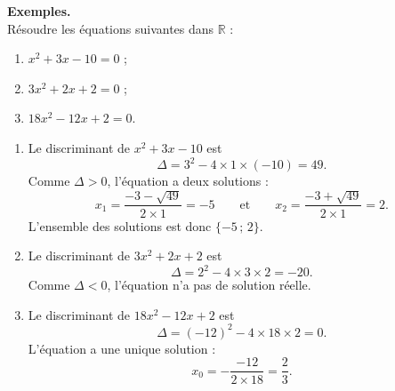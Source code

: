 \documentclass[11pt]{article}
\newcommand{\RR}{\mathbb{R}}
\newenvironment{exemples}{\par\smallskip\noindent\textbf{Exemples. \\}\ignorespaces}{\par\smallskip}
\begin{document}
\begin{exemples}
Résoudre les équations suivantes dans $\RR$ :
\begin{enumerate}[label=\arabic*.]
    \item $x^2+3x-10=0$ ;
    \item $3x^2+2x+2=0$ ;
    \item $18x^2-12x+2=0$.
\end{enumerate}

\begin{enumerate}[label=\arabic*.]
    \item Le discriminant de $x^2+3x-10$ est
    \[
    \Delta=3^2-4\times1\times(-10)=49.
    \]
    Comme $\Delta>0$, l'équation a deux solutions :
    \[
    x_1=\frac{-3-\sqrt{49}}{2\times1}=-5
    \qquad\text{et}\qquad
    x_2=\frac{-3+\sqrt{49}}{2\times1}=2.
    \]
    L'ensemble des solutions est donc $\{-5\,;\,2\}$.

    \item Le discriminant de $3x^2+2x+2$ est
    \[
    \Delta=2^2-4\times3\times2=-20.
    \]
    Comme $\Delta<0$, l'équation n'a pas de solution réelle.

    \item Le discriminant de $18x^2-12x+2$ est
    \[
    \Delta=(-12)^2-4\times18\times2=0.
    \]
    L'équation a une unique solution :
    \[
    x_0=-\frac{-12}{2\times18}=\frac{2}{3}.
    \]
\end{enumerate}
\end{exemples}
\end{document}
